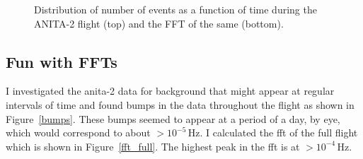 \begin{figure}
\centering
{} \par
{}
\caption{Distribution of number of events as a function of time during the ANITA-2 flight (top) and the FFT of the same (bottom).}
\label{bumps_fft_full}
\end{figure}

\subsection{Fun with FFTs}
\label{fft}

I investigated the \gls{anita}-2 data for background that might appear at regular intervals of time and found bumps in the data throughout the flight as shown in Figure~\ref{bumps}. These bumps seemed to appear at a period of a day, by eye, which would correspond to about $>10^{-5}\,\mbox{Hz}$. I calculated the \gls{fft} of the full flight which is shown in Figure~\ref{fft_full}. The highest peak in the \gls{fft} is at $>10^{-4}\,\mbox{Hz}$. 

